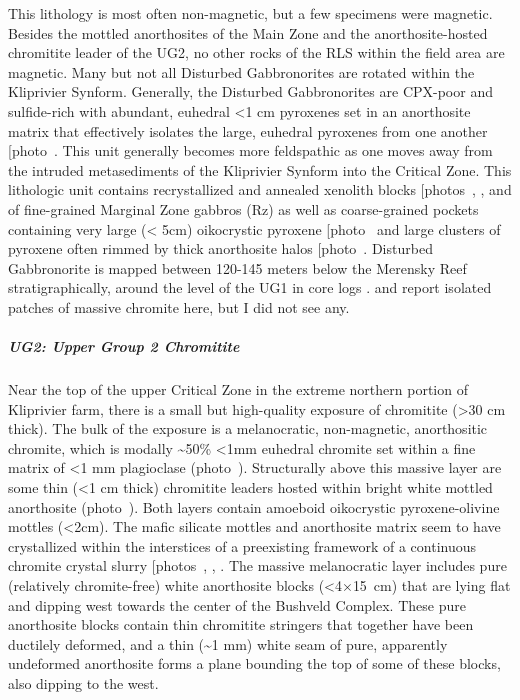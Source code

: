 This lithology is most often non-magnetic, but a few specimens were
magnetic. Besides the mottled anorthosites of the Main Zone and the
anorthosite-hosted chromitite leader of the UG2, no other rocks of the
RLS within the field area are magnetic. Many but not all Disturbed
Gabbronorites are rotated within the Kliprivier Synform. Generally, the
Disturbed Gabbronorites are CPX-poor and sulfide-rich with abundant,
euhedral \textless1 cm pyroxenes set in an anorthosite matrix that
effectively isolates the large, euhedral pyroxenes from one another
{[}photo~\ChFivePhoto{62}{]}. This unit generally becomes more feldspathic as one
moves away from the intruded metasediments of the Kliprivier Synform
into the Critical Zone. This lithologic unit contains recrystallized and
annealed xenolith blocks {[}photos~, , and \ChFivePhoto{77}{]} of fine-grained
Marginal Zone gabbros (Rz) as well as coarse-grained pockets containing
very large (\textless{} 5cm) oikocrystic pyroxene {[}photo~\ChFivePhoto{73}{]} and
large clusters of pyroxene often rimmed by thick anorthosite halos
{[}photo~\ChFivePhoto{72}{]}. Disturbed Gabbronorite is mapped between 120-145 meters
below the Merensky Reef stratigraphically, around the level of the UG1
in core logs \citep{vandermerwe2007}. \citet{vandermerwe2007} and
\citet{latypovetal2022} report isolated patches of massive chromite here, but I did
not see any.

\subparagraph{UG2: Upper Group 2 Chromitite}
\label{sec:ch5-unit-ug2}

Near the top of the upper Critical Zone in the extreme northern portion
of Kliprivier farm, there is a small but high-quality exposure of
chromitite (\textgreater30 cm thick). The bulk of the exposure is a
melanocratic, non-magnetic, anorthositic chromite, which is modally
\textasciitilde50\% \textless1mm euhedral chromite set within a fine
matrix of \textless1 mm plagioclase (photo~). Structurally above this
massive layer are some thin (\textless1 cm thick) chromitite leaders
hosted within bright white mottled anorthosite (photo~). Both layers
contain amoeboid oikocrystic pyroxene-olivine mottles (\textless2cm).
The mafic silicate mottles and anorthosite matrix seem to have
crystallized within the interstices of a preexisting framework of a
continuous chromite crystal slurry {[}photos~, \ChFivePhoto{66}{]}, \citep[see][for similar interpretations]{voordouw2009,mukherjee2017}. The
massive melanocratic layer includes pure (relatively chromite-free)
white anorthosite blocks (\textless4$\times$15~cm) that are lying flat and
dipping west towards the center of the Bushveld Complex. These pure
anorthosite blocks contain thin chromitite stringers that together have
been ductilely deformed, and a thin (\textasciitilde1 mm) white seam of
pure, apparently undeformed anorthosite forms a plane bounding the top
of some of these blocks, also dipping to the west.

